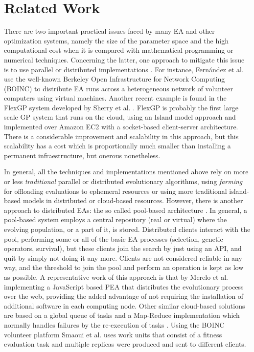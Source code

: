 \section{Related Work}
\label{sec:work}
There are two important practical issues faced by many EA and other
optimization systems, namely the size of the parameter 
space and the high computational cost when it is compared with
mathematical programming or numerical techniques. %
Concerning the latter, one approach to mitigate this issue is to use parallel or 
distributed implementations \cite{cantu-paz:migration-policies,duda2013gpu}.
For instance, Fern\'andez et al. \cite{nc} %
use the well-known Berkeley Open Infrastructure for Network Computing (BOINC) to distribute EA runs across a
heterogeneous network of volunteer computers using virtual machines. Another recent example is 
found in the FlexGP system developed by Sherry et al. \cite{sherry2012flex}. FlexGP is probably the first large scale GP system 
that runs on the cloud, using an Island model approach and implemented over Amazon EC2 with a 
socket-based client-server architecture. There is a considerable
improvement and scalability in this approach, but this scalability has
a cost which is proportionally much smaller than installing a
permanent infraestructure, but onerous nonetheless. %

In general, all the techniques and implementations mentioned above
rely on more or less {\em traditional} parallel or distributed
evolutionary algorithms, using {\em farming} for offloading
evaluations to ephemeral resources or using more traditional
island-based models in distributed or cloud-based resources. However,
there is another approach to distributed EAs: the so called pool-based
architecture \cite{talukdar1998asynchronous,pool:ga,de1991genetic}. In general, a 
pool-based system employs a central repository (real or virtual)
where the evolving population, or a part of it, is stored. 
Distributed clients interact with the pool, performing some or all of the basic EA processes 
(selection, genetic operators, survival), but these clients join the
search by just using an API, and quit by simply not doing it any
more. Clients are not considered reliable in any way, and the
threshold to join the pool and perform an operation is kept as low as
possible. 
A representative work of this approach 
is that by Merelo et al. \cite{agajaj} implementing a JavaScript based PEA that distributes 
the evolutionary process over the web, providing the added advantage of not requiring the 
installation of additional software in each computing node.  Other similar cloud-based solutions 
are based on a global queue of tasks and a Map-Reduce implementation which normally handles failures 
by the re-execution of  tasks \cite{fazenda2012,di2013towards,FlexGP}. Using the BOINC 
volunteer platform  Smaoui et al. \cite{FekiNG09} uses work units that consist of a fitness 
evaluation task and multiple replicas  were produced and sent to different clients.

